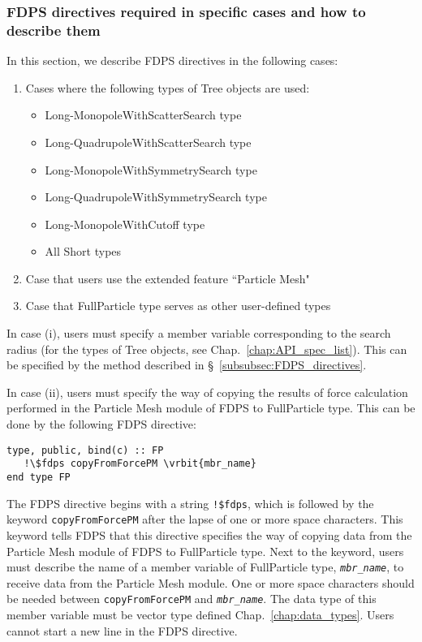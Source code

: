 \subsubsection{FDPS directives required in specific cases and how to describe them}
In this section, we describe FDPS directives in the following cases:
\begin{enumerate}[leftmargin=*,itemsep=-1ex,label=(\roman*)]
\item Cases where the following types of Tree objects are used:
\begin{itemize}
\item Long-MonopoleWithScatterSearch type
\item Long-QuadrupoleWithScatterSearch type
\item Long-MonopoleWithSymmetrySearch type
\item Long-QuadrupoleWithSymmetrySearch type
\item Long-MonopoleWithCutoff type
\item All Short types
\end{itemize}
\item Case that users use the extended feature ``Particle Mesh"
\item Case that FullParticle type serves as other user-defined types
\end{enumerate}

In case (i), users must specify a member variable corresponding to the search radius (for the types of Tree objects, see Chap.~\ref{chap:API_spec_list}). This can be specified by the method described in \S~\ref{subsubsec:FDPS_directives}.

In case (ii), users must specify the way of copying the results of force calculation performed in the Particle Mesh module of FDPS to FullParticle type. This can be done by the following FDPS directive:
\begin{screen}
\begin{Verbatim}[commandchars=\\\{\}]
type, public, bind(c) :: FP
   !\$fdps copyFromForcePM \vrbit{mbr_name}
end type FP
\end{Verbatim}
\end{screen}
The FDPS directive begins with a string \verb|!$fdps|, which is followed by the keyword \texttt{copyFromForcePM} after the lapse of one or more space characters. This keyword tells FDPS that this directive specifies the way of copying data from the Particle Mesh module of FDPS to FullParticle type. Next to the keyword, users must describe the name of a member variable of FullParticle type, \textit{\texttt{mbr\_name}}, to receive data from the Particle Mesh module. One or more space characters should be needed between \texttt{copyFromForcePM} and \textit{\texttt{mbr\_name}}. The data type of this member variable must be vector type defined Chap.~\ref{chap:data_types}. Users cannot start a new line in the FDPS directive.


